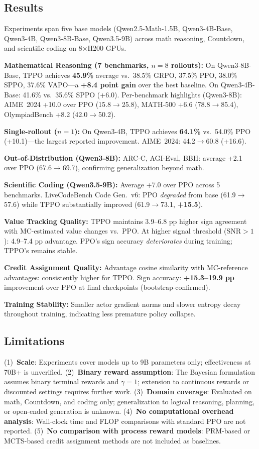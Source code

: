 \documentclass[11pt,a4paper]{article}
\begin{document}
\subsection{Results}
Experiments span five base models (Qwen2.5-Math-1.5B, Qwen3-4B-Base, Qwen3-4B, Qwen3-8B-Base, Qwen3.5-9B) across math reasoning, Countdown, and scientific coding on 8$\times$H200 GPUs.

\textbf{Mathematical Reasoning (7 benchmarks, $n{=}8$ rollouts):} On Qwen3-8B-Base, TPPO achieves \textbf{45.9\%} average vs.\ 38.5\% GRPO, 37.5\% PPO, 38.0\% SPPO, 37.6\% VAPO---a \textbf{+8.4 point gain} over the best baseline. On Qwen3-4B-Base: 41.6\% vs.\ 35.6\% SPPO (+6.0). Per-benchmark highlights (Qwen3-8B): AIME~2024 +10.0 over PPO (15.8$\to$25.8), MATH-500 +6.6 (78.8$\to$85.4), OlympiadBench +8.2 (42.0$\to$50.2).

\textbf{Single-rollout ($n{=}1$):} On Qwen3-4B, TPPO achieves \textbf{64.1\%} vs.\ 54.0\% PPO (+10.1)---the largest reported improvement. AIME~2024: 44.2$\to$60.8 (+16.6).

\textbf{Out-of-Distribution (Qwen3-8B):} ARC-C, AGI-Eval, BBH: average +2.1 over PPO (67.6$\to$69.7), confirming generalization beyond math.

\textbf{Scientific Coding (Qwen3.5-9B):} Average +7.0 over PPO across 5 benchmarks. LiveCodeBench Code Gen.~v6: PPO \emph{degraded} from base (61.9$\to$57.6) while TPPO substantially improved (61.9$\to$73.1, \textbf{+15.5}).

\textbf{Value Tracking Quality:} TPPO maintains 3.9--6.8 pp higher sign agreement with MC-estimated value changes vs.\ PPO. At higher signal threshold (SNR${>}1$): 4.9--7.4 pp advantage. PPO's sign accuracy \emph{deteriorates} during training; TPPO's remains stable.

\textbf{Credit Assignment Quality:} Advantage cosine similarity with MC-reference advantages: consistently higher for TPPO. Sign accuracy: \textbf{+15.3--19.9 pp} improvement over PPO at final checkpoints (bootstrap-confirmed).

\textbf{Training Stability:} Smaller actor gradient norms and slower entropy decay throughout training, indicating less premature policy collapse.

\subsection{Limitations}
(1)~\textbf{Scale}: Experiments cover models up to 9B parameters only; effectiveness at 70B+ is unverified. (2)~\textbf{Binary reward assumption}: The Bayesian formulation assumes binary terminal rewards and $\gamma{=}1$; extension to continuous rewards or discounted settings requires further work. (3)~\textbf{Domain coverage}: Evaluated on math, Countdown, and coding only; generalization to logical reasoning, planning, or open-ended generation is unknown. (4)~\textbf{No computational overhead analysis}: Wall-clock time and FLOP comparisons with standard PPO are not reported. (5)~\textbf{No comparison with process reward models}: PRM-based or MCTS-based credit assignment methods are not included as baselines.
\end{document}
